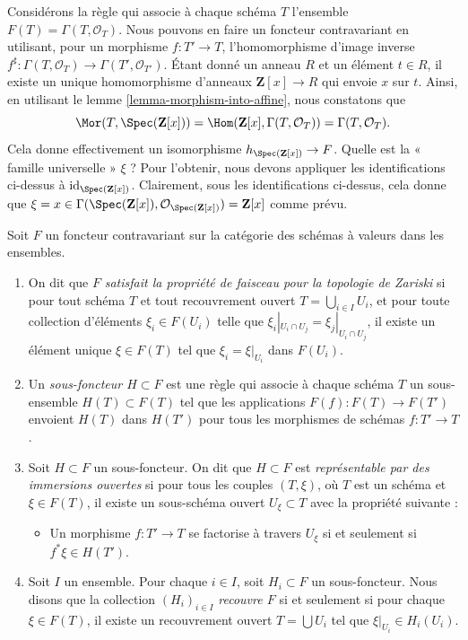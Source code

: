 \begin{example}
\label{example-global-sections}
Considérons la règle qui associe à chaque schéma $T$ l'ensemble $F(T) =
\Gamma(T, \mathcal{O}_T)$. Nous pouvons en faire un foncteur contravariant en
utilisant, pour un morphisme $f : T' \to T$, l'homomorphisme d'image inverse
$f^\sharp : \Gamma(T, \mathcal{O}_T) \to \Gamma(T', \mathcal{O}_{T'})$. Étant
donné un anneau $R$ et un élément $t \in R$, il existe un unique homomorphisme
d'anneaux $\mathbf{Z}[x] \to R$ qui envoie $x$ sur $t$. Ainsi, en
utilisant le lemme \ref{lemma-morphism-into-affine}, nous constatons que
$$
\Mor(T, \Spec(\mathbf{Z}[x])) =
\Hom(\mathbf{Z}[x], \Gamma(T, \mathcal{O}_T)) =
\Gamma(T, \mathcal{O}_T).
$$
Cela donne effectivement
un isomorphisme $h_{\Spec(\mathbf{Z}[x])} \to F$.
Quelle est la « famille universelle » $\xi$ ? Pour l'obtenir, nous
devons appliquer les identifications ci-dessus à $\text{id}_{\Spec(\mathbf{Z}[x])}$.
Clairement, sous les identifications ci-dessus,
cela
donne que $\xi = x \in \Gamma(\Spec(\mathbf{Z}[x]),
\mathcal{O}_{\Spec(\mathbf{Z}[x])}) = \mathbf{Z}[x]$
comme prévu.
\end{example}

\begin{definition}
\label{definition-representable-by-open-immersions}
Soit $F$ un foncteur contravariant sur la catégorie des
schémas à valeurs dans les ensembles.
\begin{enumerate}
\item On dit que $F$ {\it satisfait la propriété de faisceau pour la
topologie de Zariski} si pour tout schéma $T$ et tout recouvrement ouvert
$T = \bigcup_{i \in I} U_i$, et pour toute collection d'éléments
$\xi_i \in F(U_i)$ telle que $\xi_i|_{U_i \cap U_j} =
\xi_j|_{U_i \cap U_j}$, il existe un élément unique $\xi \in
F(T)$ tel que $\xi_i = \xi|_{U_i}$ dans $F(U_i)$. \item Un {\it
sous-foncteur $H \subset F$} est une règle qui associe à chaque schéma
$T$ un sous-ensemble $H(T) \subset F(T)$ tel que les applications
$F(f) : F(T) \to F(T')$ envoient $H(T)$ dans $H(T')$
pour tous les morphismes de schémas $f : T' \to T$.
\item Soit $H \subset F$ un sous-foncteur. On dit que $H
\subset F$ est {\it représentable par des immersions ouvertes}
si pour tous les couples $(T, \xi)$, où $T$ est un schéma et $\xi \in
F(T)$, il existe un sous-schéma ouvert $U_\xi \subset T$ avec la propriété
suivante :
\begin{itemize}
\item[(*)] Un morphisme $f : T' \to T$ se factorise à travers $U_\xi$ si et seulement
si $f^*\xi \in H(T')$.
\end{itemize}
\item Soit $I$ un ensemble. Pour chaque $i \in I$, soit $H_i \subset
F$ un sous-foncteur. Nous disons que la collection $(H_i)_{i \in I}$
{\it recouvre $F$} si et seulement si pour chaque $\xi \in
F(T)$, il existe un recouvrement ouvert $T = \bigcup U_i$ tel que
$\xi|_{U_i} \in H_i(U_i)$.
\end{enumerate}
\end{definition}

